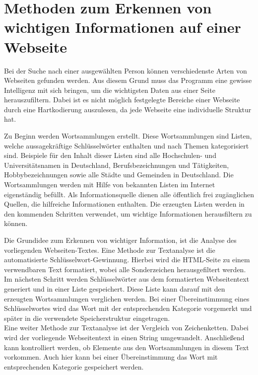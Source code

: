 \section{Methoden zum Erkennen von wichtigen Informationen auf einer Webseite}
\label{subsec:ErkennenVonInformation}
Bei der Suche nach einer ausgewählten Person können verschiedenste Arten von Webseiten gefunden werden. Aus diesem Grund muss das Programm eine gewisse Intelligenz mit sich bringen, um die wichtigsten Daten aus einer Seite herauszufiltern. Dabei ist es nicht möglich festgelegte Bereiche einer Webseite durch eine Hartkodierung auszulesen, da jede Webseite eine individuelle Struktur hat.

Zu Beginn werden Wortsammlungen erstellt. Diese Wortsammlungen sind Listen, welche aussagekräftige Schlüsselwörter enthalten und nach Themen kategorisiert sind. Beispiele für den Inhalt dieser Listen sind alle Hochschulen- und Universitätsnamen in Deutschland, Berufsbezeichnungen und Tätigkeiten, Hobbybezeichnungen sowie alle Städte und Gemeinden in Deutschland. Die Wortsammlungen werden mit Hilfe von bekannten Listen im Internet eigenständig befüllt. Als Informationsquelle dienen alle öffentlich frei zugänglichen Quellen, die hilfreiche Informationen enthalten. Die erzeugten Listen werden in den kommenden Schritten verwendet, um wichtige Informationen herausfiltern zu können.

Die Grundidee zum Erkennen von wichtiger Information, ist die Analyse des vorliegenden Webseiten-Textes. Eine Methode zur Textanalyse ist die automatisierte Schlüsselwort-Gewinnung. Hierbei wird die HTML-Seite zu einem verwendbaren Text formatiert, wobei alle Sonderzeichen herausgefiltert werden. Im nächsten Schritt werden Schlüsselwörter aus dem formatierten Webseitentext generiert und in einer Liste gespeichert. Diese Liste kann darauf mit den erzeugten Wortsammlungen verglichen werden. Bei einer Übereinstimmung eines Schlüsselwortes wird das Wort mit der entsprechenden Kategorie vorgemerkt und später in die verwendete Speicherstruktur eingetragen.\\
Eine weiter Methode zur Textanalyse ist der Vergleich von Zeichenketten. Dabei wird der vorliegende Webseitentext in einen String umgewandelt. Anschließend kann kontrolliert werden, ob Elemente aus den Wortsammlungen in diesem Text vorkommen. Auch hier kann bei einer Übereinstimmung das Wort mit entsprechenden Kategorie gespeichert werden.

